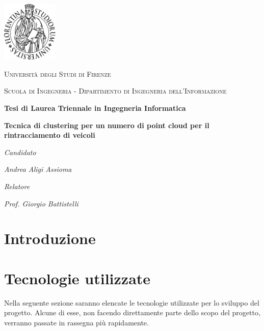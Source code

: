 \documentclass[italian]{article}
\begin{document}
\begin{titlepage}
	\centering
	\includegraphics[width=0.2\textwidth]{logo}\par\vspace{1cm}
	{\scshape\Large Università degli Studi di Firenze \par}
	\vspace{0.5cm}
	{\scshape\large Scuola di Ingegneria - Dipartimento di Ingegneria dell'Informazione \par}
	\vspace{1.5cm}
	{\textbf{Tesi di Laurea Triennale in Ingegneria Informatica} \par}
	\vspace{2cm}

	{\LARGE\bfseries Tecnica di clustering per un numero di point cloud per il rintracciamento di veicoli \par}

	\vspace{2cm}
	{\textit{Candidato} \par}
	{\itshape Andrea Aligi Assioma\par}
	\vspace{1cm}
	{\textit{Relatore} \par}
	{\itshape Prof. Giorgio Battistelli\par}
\end{titlepage}

\justifying

\tableofcontents
\newpage
\section{Introduzione}

\section{Tecnologie utilizzate}
Nella seguente sezione saranno elencate le tecnologie utilizzate per lo sviluppo del progetto. Alcune di esse, non facendo direttamente parte dello scopo del progetto, verranno passate in rassegna più rapidamente.
\end{document}
